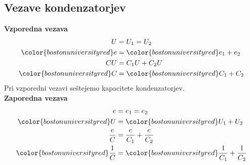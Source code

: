 {\color{indiagreen}\subsection{Vezave kondenzatorjev}}
\textbf{Vzporedna vezava}
\begin{align*}
	U &= U_1 = U_2\\
	{\color{bostonuniversityred}e} &= {\color{bostonuniversityred}e_1 + e_2}\\
	CU &= C_1U + C_2U\\
	{\color{bostonuniversityred}C} &= {\color{bostonuniversityred}C_1 + C_2}\\
\end{align*}
Pri vzporedni vezavi seštejemo kapacitete kondenzatorjev.\\
\textbf{Zaporedna vezava}
\begin{align*}
	e &= e_1 = e_2\\
	{\color{bostonuniversityred}U} &= {\color{bostonuniversityred}U_1 + U_2}\\
	\frac{e}{C} &= \frac{e}{C_1} + \frac{e}{C_2}\\
	{\color{bostonuniversityred}\frac{1}{C}} &= {\color{bostonuniversityred}\frac{1}{C_1} + \frac{1}{C_2}}\\
\end{align*}